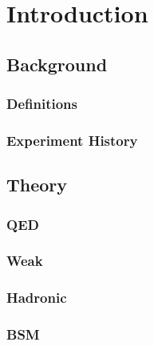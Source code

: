 \chapter{Introduction}
\label{chapter:Introduction}
\thispagestyle{myheadings} %

\section{Background}
\label{sec:Background}

\subsection{Definitions}
\label{subsec:Definitions}

\subsection{Experiment History}
\label{subsec:ExperimentHistory}

\section{Theory}
\label{sec:Theory}

\subsection{QED}
\label{subsec:QED}

\subsection{Weak}
\label{subsec:Weak}

\subsection{Hadronic}
\label{subsec:Hadronic}

\subsection{BSM}
\label{subsec:BSM}

\cite{lamport1985:latex} %
